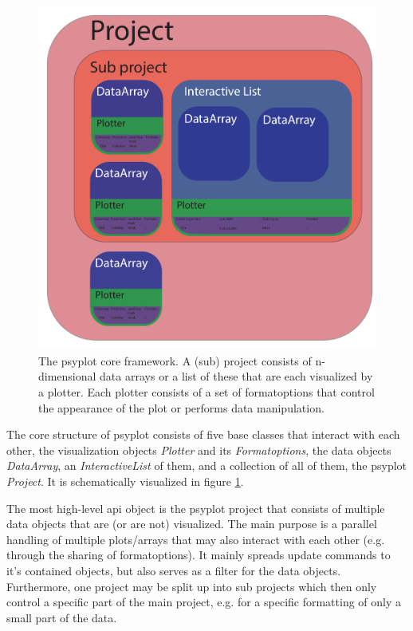 \begin{refsection}
\begin{figure}
	\includegraphics[width=\linewidth]{psyplot-figures/psyplot_framework.pdf}
	\caption[The psyplot core framework]{The psyplot core framework. A (sub) project consists of n-dimensional data arrays or a list of these that are each visualized by a plotter. Each plotter consists of a set of formatoptions that control the appearance of the plot or performs data manipulation.}
	\label{fig:psyplot-core}
\end{figure}

The core structure of psyplot consists of five base classes that interact with each other, the visualization objects \textit{Plotter} and its \textit{Formatoptions}, the data objects \textit{DataArray}, an \textit{InteractiveList} of them, and a collection of all of them, the psyplot \textit{Project}. It is schematically visualized in figure \ref{fig:psyplot-core}.

The most high-level \gls{api} object is the psyplot project that consists of multiple data objects that are (or are not) visualized. The main purpose is a parallel handling of multiple plots/arrays that may also interact with each other (e.g. through the sharing of formatoptions). It mainly spreads update commands to it's contained objects, but also serves as a filter for the data objects. Furthermore, one project may be split up into sub projects which then only control a specific part of the main project, e.g. for a specific formatting of only a small part of the data.


\end{refsection}

